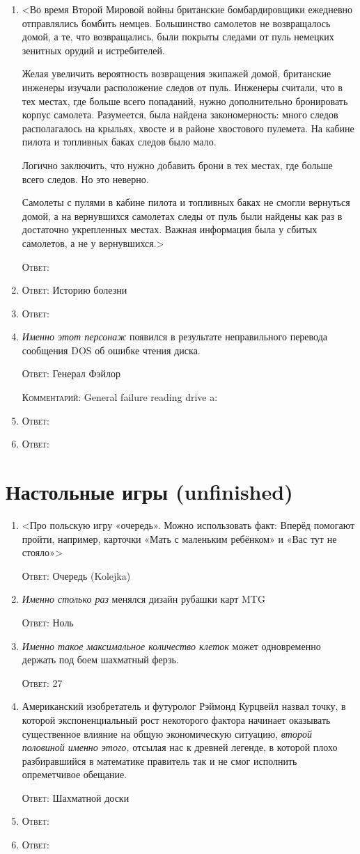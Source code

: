 \documentclass[a4paper,10pt]{article}
\let\keyword\textsc
\newenvironment{topic}{\begin{enumerate}}{\end{enumerate}}
\newcommand{\question}[3]{\item[#1.] #2 \par \keyword{Ответ:} #3}
\newcommand{\commentary}[1]{\par \keyword{Комментарий:} #1}
\begin{document}
\begin{topic}
 \question{??}{<Во время Второй Мировой войны британские бомбардировщики ежедневно отправлялись бомбить немцев. Большинство самолетов не возвращалось домой, а те, что возвращались, были покрыты следами от пуль немецких зенитных орудий и истребителей.

 Желая увеличить вероятность возвращения экипажей домой, британские инженеры изучали расположение следов от пуль. Инженеры считали, что в тех местах, где больше всего попаданий, нужно дополнительно бронировать корпус самолета. Разумеется, была найдена закономерность: много следов располагалось на крыльях, хвосте и в районе хвостового пулемета. На кабине пилота и топливных баках следов было мало.

 Логично заключить, что нужно добавить брони в тех местах, где больше всего следов. Но это неверно.

 Самолеты с пулями в кабине пилота и топливных баках не смогли вернуться домой, а на вернувшихся самолетах следы от пуль были найдены как раз в достаточно укрепленных местах. Важная информация была у сбитых самолетов, а не у вернувшихся.>}{}
 \question{10--20}{<вопрос про одноимённую песню Высоцкого: именно это на самом деле>}{Историю болезни}
 \question{20}{}{}
 \question{30}{\emph{Именно этот персонаж} появился в результате неправильного перевода сообщения DOS об ошибке чтения диска.}{Генерал Фэйлор}\commentary{General failure reading drive a:}
 \question{40}{}{}
 \question{50}{}{}
\end{topic}


\section{Настольные игры (unfinished)}

\begin{topic}
 \question{??}{<Про польскую игру «очередь». Можно использовать факт: Вперёд помогают пройти, например, карточки «Мать с маленьким ребёнком» и «Вас тут не стояло»>}{Очередь (Kolejka)}
 \question{0--10}{\emph{Именно столько раз} менялся дизайн рубашки карт MTG}{Ноль}
 \question{10--20}{\emph{Именно такое максимальное количество клеток} может одновременно держать под боем шахматный ферзь.}{27}
 \question{20--30}{Американский изобретатель и футуролог Рэймонд Курцвейл назвал точку, в которой экспоненциальный рост некоторого фактора начинает оказывать существенное влияние на общую экономическую ситуацию, \emph{второй половиной именно этого,} отсылая нас к древней легенде, в которой плохо разбиравшийся в математике правитель так и не смог исполнить опреметчивое обещание.}{Шахматной доски}
 \question{40}{}{}
 \question{50}{}{}
\end{topic}
\end{document}
